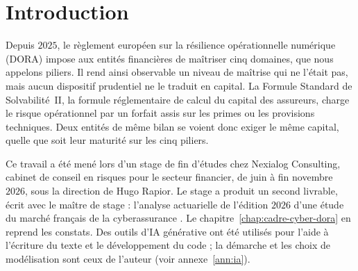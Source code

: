 
\chapter*{Introduction}
{}
\label{subsec:problematique-positionnement}

Depuis $2025$, le règlement européen sur la résilience opérationnelle numérique (DORA) impose aux
entités financières de maîtriser cinq domaines, que nous appelons piliers. Il rend ainsi observable un
niveau de maîtrise qui ne l'était pas, mais aucun dispositif prudentiel ne le traduit en capital. La Formule
Standard de Solvabilité~II, la formule réglementaire de calcul du capital des assureurs, charge le risque
opérationnel par un forfait assis sur les primes ou les provisions techniques. Deux entités de même bilan
se voient donc exiger le même capital, quelle que soit leur maturité sur les cinq piliers.

Ce travail a été mené lors d'un stage de fin d'études chez Nexialog Consulting, cabinet de conseil
en risques pour le secteur financier, de juin à fin novembre $2026$, sous la direction de Hugo Rapior.
Le stage a produit un second livrable, écrit avec le maître de stage : l'analyse actuarielle de
l'édition $2026$ d'une étude du marché français de la cyberassurance \citep{RapiorKaddouri2026}. Le
chapitre~\ref{chap:cadre-cyber-dora} en reprend les constats. Des outils d'IA générative ont été
utilisés pour l'aide à l'écriture du texte et le développement du code ; la démarche et les choix de
modélisation sont ceux de l'auteur (voir annexe~\ref{ann:ia}).

